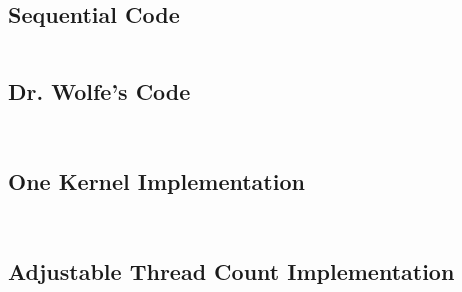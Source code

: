 \documentclass[10pt]{article}
\begin{document}
\subsection{Sequential Code}
\inputminted[linenos, fontsize=\footnotesize]{c}{../jacobi_final/seq_jacobi.c}

\subsection{Dr. Wolfe's Code}
\inputminted[linenos, fontsize=\footnotesize]{c}{../jacobi_final/original_jacobi5.cu}
\inputminted[linenos, fontsize=\footnotesize]{c}{../jacobi_final/original_jacobi6.cu}

\subsection{One Kernel Implementation}
\inputminted[linenos, fontsize=\footnotesize]{c}{../jacobi_final/1k_jacobi5.cu}
\inputminted[linenos, fontsize=\footnotesize]{c}{../jacobi_final/1k_jacobi6.cu}

\subsection{Adjustable Thread Count Implementation}
\inputminted[linenos, fontsize=\footnotesize]{c}{../jacobi_final/orig_J6M_v2.cu}
\inputminted[linenos, fontsize=\footnotesize]{c}{../jacobi_final/1k_J6M_v2.cu}
\end{document}
